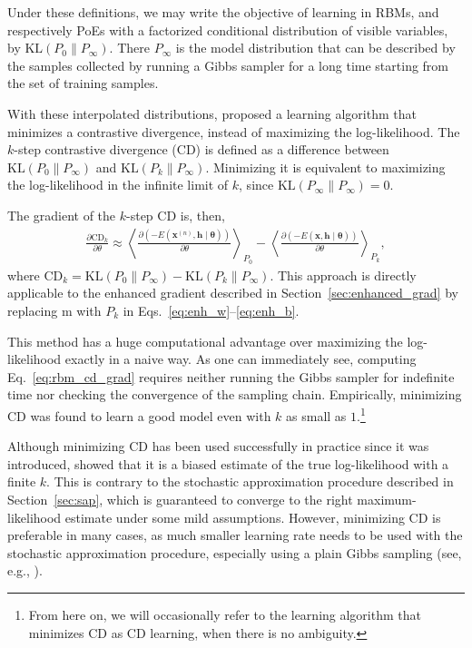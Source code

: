 \documentclass[dissertation,nocontribution]{aaltoseries}
\newcommand{\vect}[1]{\mathbf{#1}}
\newcommand{\vects}[1]{\boldsymbol{#1}}
\newcommand{\vh}[0]{\vect{h}}
\newcommand{\vx}[0]{\vect{x}}
\newcommand{\tf}[0]{\text{m}}
\newcommand{\TT}[0]{{\vects{\theta}}}
\newcommand{\KL}[0]{\text{KL}}
\newcommand{\CD}[0]{\text{CD}}
\begin{document}
Under these definitions, we may write the objective of
learning in RBMs, and respectively PoEs with a factorized
conditional distribution of visible variables, by $\KL(P_0
\| P_\infty)$. There $P_\infty$ is the model distribution
that can be described by the samples collected by running a
Gibbs sampler for a long time starting from the set of training
samples.

With these interpolated distributions, \citet{Hinton2002}
proposed a learning algorithm that minimizes a contrastive
divergence, instead of maximizing the log-likelihood. 
The
$k$-step contrastive divergence
(CD) is defined as a
difference between $\KL(P_0 \| P_{\infty})$ and $\KL(P_k \|
P_\infty)$. Minimizing it is equivalent to maximizing
the log-likelihood in the infinite limit of $k$, since
$\KL(P_\infty \| P_\infty) = 0$.

The gradient of the $k$-step CD is, then,
\begin{align}
    \label{eq:rbm_cd_grad}
    \frac{\partial \CD_k}{\partial \theta} \approx
    \left< \frac{\partial
    \left(-E(\vx^{(n)}, \vh\mid\TT)\right)}{\partial \theta}
    \right>_{P_0} 
    -
    \left< \frac{\partial
    \left(-E(\vx, \vh\mid\TT)\right)}{\partial \theta}
    \right>_{P_k},
\end{align}
where $\CD_k = \KL(P_0 \| P_{\infty}) - \KL(P_k
\| P_\infty)$. This approach is directly applicable to the
enhanced gradient described in
Section~\ref{sec:enhanced_grad} by replacing $\tf$ with
$P_k$ in Eqs.~\eqref{eq:enh_w}--\eqref{eq:enh_b}.

This method has a huge computational advantage over
maximizing the log-likelihood exactly in a naive way. As one
can immediately see, computing Eq.~\eqref{eq:rbm_cd_grad}
requires neither running the Gibbs sampler for indefinite
time nor checking the convergence of the sampling chain.
Empirically, minimizing CD was found to learn a good model
even with $k$ as small as $1$.\footnote{ From here on, we
will occasionally refer to the learning algorithm that
minimizes CD as CD learning, when there is no ambiguity.}

Although minimizing CD has been used successfully in
practice since it was introduced,
\cite{Carreira-Perpinan2005,Bengio2009} showed that it is a
biased estimate of the true log-likelihood with a finite
$k$. This is contrary to the stochastic approximation
procedure described in Section~\ref{sec:sap}, which is
guaranteed to converge to the right maximum-likelihood
estimate under some mild assumptions. However, minimizing CD
is preferable in many cases,
as
much smaller learning rate needs to be used with the
stochastic approximation procedure, especially using a plain
Gibbs sampling (see, e.g., \citep{Hinton2012rbm}).
\end{document}
